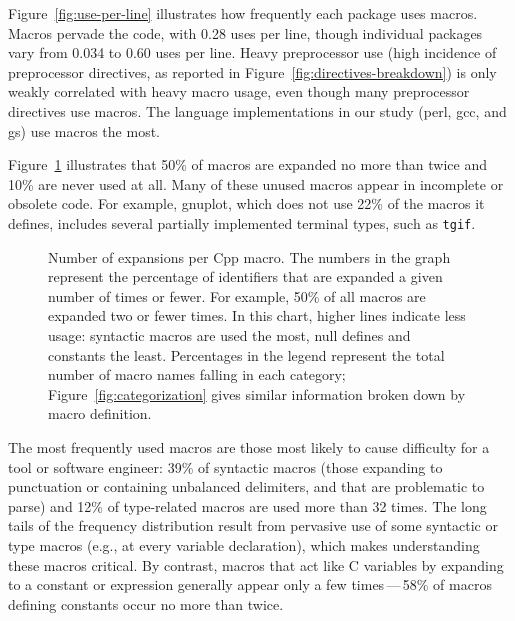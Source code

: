 \documentclass[10pt]{article}
\newcommand{\pkg}[1]{\textsf{#1}}
\newcommand{\captionsmall}[1]{\caption[]{\small #1}}
\begin{document}

Figure~\ref{fig:use-per-line} illustrates how frequently each package uses
macros.  Macros pervade the code, with 0.28 uses per line, though
individual packages vary from 0.034 to 0.60 uses per line.  Heavy preprocessor
use (high incidence of preprocessor directives, as reported in
Figure~\ref{fig:directives-breakdown}) is only weakly correlated with
heavy macro usage, even though many preprocessor directives use macros.
The language implementations in our study (\pkg{perl}, \pkg{gcc}, and
\pkg{gs}) use macros the most.


Figure~\ref{fig:freq-use-cat} illustrates that 50\% of macros are expanded
no more than twice and 10\% are never used at all.  Many of these unused
macros appear in incomplete or obsolete code.  For example, \pkg{gnuplot},
which does not use 22\% of the macros it defines, includes several
partially implemented terminal types, such as {\tt tgif}.

\begin{figure}
\centerline{}
\captionsmall{Number of expansions per Cpp macro.  The numbers in the
  graph represent the percentage of identifiers that are expanded a given
  number of times or fewer.  For example, 50\% of all macros are expanded
  two or fewer times.  In this chart, higher lines indicate less usage:
  syntactic macros are used the most, null defines and constants the least.
  Percentages in the legend represent the total number of
  macro names falling in each category; Figure~\ref{fig:categorization}
  gives similar information broken down by macro definition.}
\label{fig:freq-use-cat}
\end{figure}




The most frequently used macros are those most likely to cause difficulty
for a tool or software engineer:  39\% of syntactic macros (those expanding
to punctuation or containing unbalanced delimiters, and that are
problematic to parse) and 12\% of type-related macros are used more than 32
times.  The long tails of the frequency distribution result from pervasive
use of some syntactic or type macros (e.g., at every variable declaration),
which makes understanding these macros critical.  By contrast, macros that
act like C variables by expanding to a constant or expression generally
appear only a few times\,---\,58\% of macros defining constants occur no
more than twice.
\end{document}
